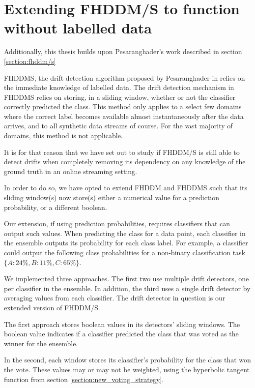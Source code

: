 \section{Extending FHDDM/S to function without labelled data}

Additionally, this thesis builds upon Pesaranghader's work described in section \ref{section:fhddm/s}

FHDDMS, the drift detection algorithm proposed by Pesaranghader in \cite{pesaranghader2016fast} relies on the immediate knowledge of labelled data. The drift detection mechanism in FHDDMS relies on storing, in a sliding window, whether or not the classifier correctly predicted the class. This method only applies to a select few domains where the correct label becomes available almost instantaneously after the data arrives, and to all synthetic data streams of course. For the vast majority of domains, this method is not applicable.

It is for that reason that we have set out to study if FHDDM/S is still able to detect drifts when completely removing its dependency on any knowledge of the ground truth in an online streaming setting.

In order to do so, we have opted to extend FHDDM and FHDDMS such that its sliding window(s) now store(s) either a numerical value for a prediction probability, or a different boolean.

Our extension, if using prediction probabilities, requires classifiers that can output such values. When predicting the class for a data point, each classifier in the ensemble outputs its probability for each class label. For example, a classifier could output the following class probabilities for a non-binary classification task $\{A: 24\%, B: 11\%, C: 65\%\}$.

We implemented three approaches. The first two use multiple drift detectors, one per classifier in the ensemble. In addition, the third uses a single drift detector by averaging values from each classifier. The drift detector in question is our extended version of FHDDM/S.

The first approach stores boolean values in its detectors' sliding windows. The boolean value indicates if a classifier predicted the class that was voted as the winner for the ensemble.

In the second, each window stores its classifier's probability for the class that won the vote. These values may or may not be weighted, using the hyperbolic tangent function from section \ref{section:new_voting_strategy}.

